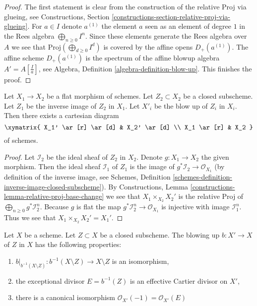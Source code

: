 \begin{proof}
The first statement is clear from the construction of the relative Proj via
glueing, see Constructions, Section
\ref{constructions-section-relative-proj-via-glueing}.
For $a \in I$ denote $a^{(1)}$ the element $a$ seen as an element of
degree $1$ in the Rees algebra $\bigoplus_{n \geq 0} I^n$.
Since these elements generate the Rees algebra over $A$ we see that
$\text{Proj}(\bigoplus_{d \geq 0} I^d)$ is covered by the affine opens
$D_{+}(a^{(1)})$. The affine scheme $D_{+}(a^{(1)})$ is the spectrum of 
the affine blowup algebra $A' = A[\frac{I}{a}]$, see
Algebra, Definition \ref{algebra-definition-blow-up}.
This finishes the proof.
\end{proof}

\begin{lemma}
\label{lemma-flat-base-change-blowing-up}
Let $X_1 \to X_2$ be a flat morphism of schemes. Let $Z_2 \subset X_2$ be a
closed subscheme. Let $Z_1$ be the inverse image of $Z_2$ in $X_1$.
Let $X'_i$ be the blow up of $Z_i$ in $X_i$. Then there exists a cartesian
diagram
$$
\xymatrix{
X_1' \ar[r] \ar[d] & X_2' \ar[d] \\
X_1 \ar[r] & X_2
}
$$
of schemes.
\end{lemma}

\begin{proof}
Let $\mathcal{I}_2$ be the ideal sheaf of $Z_2$ in $X_2$.
Denote $g : X_1 \to X_2$ the given morphism. Then the ideal sheaf
$\mathcal{I}_1$ of $Z_1$ is the image of
$g^*\mathcal{I}_2 \to \mathcal{O}_{X_1}$
(by definition of the inverse image, see
Schemes, Definition \ref{schemes-definition-inverse-image-closed-subscheme}).
By Constructions, Lemma \ref{constructions-lemma-relative-proj-base-change}
we see that $X_1 \times_{X_2} X_2'$ is the relative Proj of
$\bigoplus_{n \geq 0} g^*\mathcal{I}_2^n$. Because $g$ is flat the map
$g^*\mathcal{I}_2^n \to \mathcal{O}_{X_1}$ is injective with image
$\mathcal{I}_1^n$. Thus we see that $X_1 \times_{X_2} X_2' = X_1'$.
\end{proof}

\begin{lemma}
\label{lemma-blowing-up-gives-effective-Cartier-divisor}
Let $X$ be a scheme. Let $Z \subset X$ be a closed subscheme.
The blowing up $b : X' \to X$ of $Z$ in $X$
has the following properties:
\begin{enumerate}
\item $b|_{b^{-1}(X \setminus Z)} : b^{-1}(X \setminus Z) \to X \setminus Z$
is an isomorphism,
\item the exceptional divisor $E = b^{-1}(Z)$ is an effective Cartier divisor
on $X'$,
\item there is a canonical isomorphism
$\mathcal{O}_{X'}(-1) = \mathcal{O}_{X'}(E)$
\end{enumerate}
\end{lemma}

